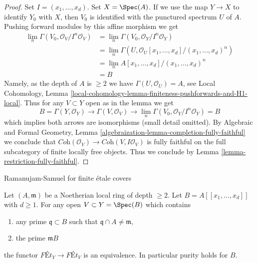 \begin{proof}
Set $I = (x_1, \ldots, x_d)$. Set $X = \Spec(A)$.
If we use the map $Y \to X$ to identify $Y_0$ with $X$,
then $V_0$ is identified with the punctured spectrum $U$ of $A$.
Pushing forward modules by this affine morphism we get
\begin{align*}
\lim_n \Gamma(V_0, \mathcal{O}_V/I^n\mathcal{O}_V)
& =
\lim_n \Gamma(V_0, \mathcal{O}_Y/I^n\mathcal{O}_Y) \\
& =
\lim_n \Gamma(U, \mathcal{O}_U[x_1, \ldots, x_d]/(x_1, \ldots, x_d)^n) \\
& =
\lim_n A[x_1, \ldots, x_d]/(x_1, \ldots, x_d)^n \\
& =
B
\end{align*}
Namely, as the depth of $A$ is $\geq 2$ we have $\Gamma(U, \mathcal{O}_U) = A$,
see Local Cohomology, Lemma
\ref{local-cohomology-lemma-finiteness-pushforwards-and-H1-local}.
Thus for any $V \subset Y$ open as in the lemma we get
$$
B = \Gamma(Y, \mathcal{O}_Y) \to \Gamma(V, \mathcal{O}_V) \to
\lim_n \Gamma(V_0, \mathcal{O}_Y/I^n\mathcal{O}_Y) = B
$$
which implies both arrows are isomorphisms (small detail omitted).
By Algebraic and Formal Geometry, Lemma 
\ref{algebraization-lemma-completion-fully-faithful}
we conclude that
$\textit{Coh}(\mathcal{O}_V) \to \textit{Coh}(V, I\mathcal{O}_V)$
is fully faithful on the full subcategory of finite locally free objects.
Thus we conclude by
Lemma \ref{lemma-restriction-fully-faithful}.
\end{proof}

\begin{lemma}
\label{lemma-purity-power-series-over-depth2}
\begin{slogan}
Ramanujam-Samuel for finite \'etale covers
\end{slogan}
Let $(A, \mathfrak m)$ be a Noetherian local ring of depth $\geq 2$. Let
$B = A[[x_1, \ldots, x_d]]$ with $d \geq 1$. For any open
$V \subset Y = \Spec(B)$ which contains
\begin{enumerate}
\item any prime $\mathfrak q \subset B$ such that
$\mathfrak q \cap A \not = \mathfrak m$,
\item the prime $\mathfrak m B$
\end{enumerate}
the functor
$
\textit{F\'Et}_Y
\to
\textit{F\'Et}_V
$
is an equivalence. In particular purity holds for $B$.
\end{lemma}

